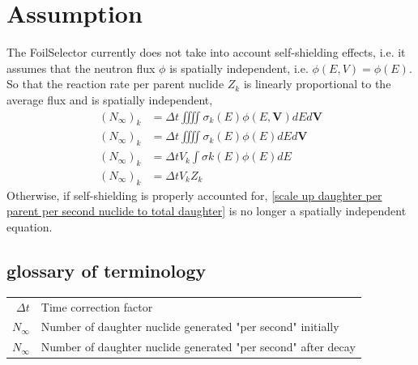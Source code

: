 \documentclass[a4paper, 12pt]{article}
\newcommand{\ve}[1]{\boldsymbol{#1}}
\begin{document}
\section{Assumption}
The FoilSelector currently does not take into account self-shielding effects, i.e. it assumes that the neutron flux $\phi$ is spatially independent, i.e. $\phi(E,V) = \phi(E)$. 
So that the reaction rate per parent nuclide $Z_k$ is linearly proportional to the average flux and is spatially independent,
\begin{align}
     (N_\infty)_k &= \Delta t \iiiint \sigma_{k}(E) \phi(E,\ve{V}) dE d\ve{V} \\
     (N_\infty)_k &= \Delta t \iiiint \sigma_{k}(E) \phi(E) dE d\ve{V} \\
     (N_\infty)_k &= \Delta t V_k \int \sigma{k}(E) \phi(E) dE \\
     (N_\infty)_k &= \Delta t V_k Z_k \label{scale up daughter per parent per second nuclide to total daughter}
\end{align}
Otherwise, if self-shielding is properly accounted for, \ref{scale up daughter per parent per second nuclide to total daughter} is no longer a spatially independent equation.
% 
% 


\begin{appendices}
\section{glossary of terminology}
\begin{longtable}{rl}
    $\Delta t$&Time correction factor \\
    $N_\infty$&Number of daughter nuclide generated "per second" initially\\
    $N_\infty$&Number of daughter nuclide generated "per second" after decay
\end{longtable}
\end{appendices}
\end{document}

